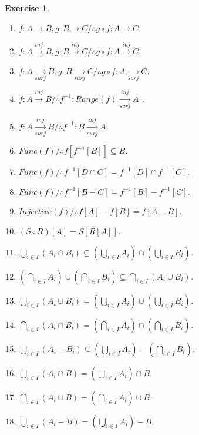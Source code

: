 \documentclass[10pt,a4paper]{book}
\newtheorem{exercise}{Exercise}[section]
\begin{document}
\begin{exercise}
\begin{enumerate}
        \item $f:A\to B , g:B\to C  / \therefore g\circ f:A\to C$.
        \item $f:A\xrightarrow{inj}B , g:B\xrightarrow{inj}C / \therefore g\circ f:A\xrightarrow{inj}C$.
        \item $f:A\xrightarrow[surj]{}B , g:B\xrightarrow[surj]{}C  / \therefore g\circ f:A\xrightarrow[surj]{}C$.
        \item $f:A\xrightarrow{inj}B  / \therefore f^{-1}:Range(f) \xrightarrow[surj]{inj} A$ .
        \item $f:A\xrightarrow[surj]{inj}B  / \therefore f^{-1}:B\xrightarrow[surj]{inj}A$.
        \item $Func(f)  / \therefore f[f^{-1}[B]]\subseteq B$.
        \item $Func(f)  / \therefore f^{-1}[D \cap C]=f^{-1}[D]\cap f^{-1}[C]$.
        \item $Func(f)  / \therefore f^{-1}[B-C]=f^{-1}[B]-f^{-1}[C]$.
        \item $Injective(f)  / \therefore f[A]-f[B] =   f[A-B]$.
        \item $  (S \circ R )[A]= S [ R[A]]$.
        \item $\bigcup_{i\in I}(A_i\cap B_i)\subseteq
                  \left(\bigcup_{i \in I}A_i\right)\cap
                  \left(\bigcup_{i \in I}B_i\right)$.
        \item $\left(\bigcap_{i\in I}A_i\right)\cup
                  \left(\bigcap_{i\in I}B_i\right)\subseteq
                  \bigcap_{i\in I}(A_i\cup B_i)$.
        \item $\bigcup_{i\in I}(A_i\cup B_i)=
                  \left(\bigcup_{i\in I}A_i\right)\cup
                  \left(\bigcup_{i\in I}B_i\right)$.
        \item $\bigcap_{i\in I}(A_i\cap B_i)=
                  \left(\bigcap_{i\in I}A_i\right)\cap
                  \left(\bigcap_{i\in I}B_i\right)$.
        \item $\bigcup_{i\in I}(A_i - B_i)\subseteq
                  \left(\bigcup_{i\in I}A_i\right)-
                  \left(\bigcap_{i\in I}B_i\right)$.
        \item $\bigcup_{i\in I}(A_i\cap B)
                  =\left(\bigcup_{i\in I}A_i\right)\cap B$.
        \item $\bigcap_{i\in I}(A_i\cup B)
                  =\left(\bigcap_{i\in I}A_i\right)\cup B$.
        \item $\bigcup_{i\in I}(A_i- B)
                  =\left(\bigcup_{i\in I}A_i\right)- B$.

\end{enumerate}
\end{exercise}
\end{document}
